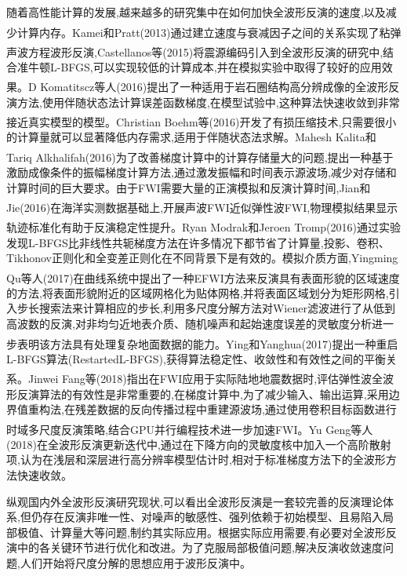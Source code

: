 \documentclass[11pt]{article}
\newcommand{\upcite}[1]{\textsuperscript{\textsuperscript{\cite{#1}}}}
\begin{document}
随着高性能计算的发展,越来越多的研究集中在如何加快全波形反演的速度,以及减少计算内存。Kamei和Pratt\upcite{Kamei2013}(2013)通过建立速度与衰减因子之间的关系实现了粘弹声波方程波形反演,Castellanos等\upcite{Clara2015}(2015)将震源编码引入到全波形反演的研究中,结合准牛顿L-BFGS,可以实现较低的计算成本,并在模拟实验中取得了较好的应用效果。D Komatitscz等人\upcite{Dimitri2016}(2016)提出了一种适用于岩石圈结构高分辨成像的全波形反演方法,使用伴随状态法计算误差函数梯度,在模型试验中,这种算法快速收敛到非常接近真实模型的模型。Christian Boehm等\upcite{Christian2016}(2016)开发了有损压缩技术,只需要很小的计算量就可以显著降低内存需求,适用于伴随状态法求解。Mahesh Kalita和Tariq Alkhalifah\upcite{Mahesh2016}(2016)为了改善梯度计算中的计算存储量大的问题,提出一种基于激励成像条件的振幅梯度计算方法,通过激发振幅和时间表示源波场,减少对存储和计算时间的巨大要求。由于FWI需要大量的正演模拟和反演计算时间,Jian和Jie\upcite{JianC2016}(2016)在海洋实测数据基础上,开展声波FWI近似弹性波FWI,物理模拟结果显示轨迹标准化有助于反演稳定性提升。Ryan Modrak和Jeroen Tromp\upcite{Ryan2016}(2016)通过实验发现L-BFGS比非线性共轭梯度方法在许多情况下都节省了计算量,投影、卷积、Tikhonov正则化和全变差正则化在不同背景下是有效的。模拟介质方面,Yingming Qu等人\upcite{Yingming2017}(2017)在曲线系统中提出了一种EFWI方法来反演具有表面形貌的区域速度的方法,将表面形貌附近的区域网格化为贴体网格,并将表面区域划分为矩形网格,引入步长搜索法来计算相应的步长,利用多尺度分解方法对Wiener滤波进行了从低到高波数的反演,对非均匀近地表介质、随机噪声和起始速度误差的灵敏度分析进一步表明该方法具有处理复杂地面数据的能力。Ying和Yanghua\upcite{YingR2017}(2017)提出一种重启L-BFGS算法(RestartedL-BFGS),获得算法稳定性、收敛性和有效性之间的平衡关系。Jinwei Fang等\upcite{FangJ2018}(2018)指出在FWI应用于实际陆地地震数据时,评估弹性波全波形反演算法的有效性是非常重要的,在梯度计算中,为了减少输入、输出运算,采用边界值重构法,在残差数据的反向传播过程中重建源波场,通过使用卷积目标函数进行时域多尺度反演策略,结合GPU并行编程技术进一步加速FWI。Yu Geng等人\upcite{YuG2018}(2018)在全波形反演更新迭代中,通过在下降方向的灵敏度核中加入一个高阶散射项,认为在浅层和深层进行高分辨率模型估计时,相对于标准梯度方法下的全波形方法快速收敛。
\par
纵观国内外全波形反演研究现状,可以看出全波形反演是一套较完善的反演理论体系,但仍存在反演非唯一性、对噪声的敏感性、强列依赖于初始模型、且易陷入局部极值、计算量大等问题,制约其实际应用。根据实际应用需要,有必要对全波形反演中的各关键环节进行优化和改进。为了克服局部极值问题,解决反演收敛速度问题,人们开始将尺度分解的思想应用于波形反演中。
\par
\end{document}
